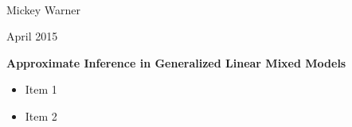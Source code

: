 \documentclass[mathserif, 11pt, t]{beamer}
\renewcommand{\subtitle}[1]{\vspace{0.45cm}\textcolor{bluegreen}{
    {\textbf{#1}}}\vspace{0.15cm}\newline}
\begin{document}
\begin{center}
\ \\ [-0.5in]
\vfill
\bigskip
\bigskip
\bigskip
\bigskip
\bigskip

\begin{LARGE}
\begin{center}

\end{center}
\end{LARGE}
\vfill

\begin{center}
Mickey Warner
\end{center}
\vfill
April 2015
\bigskip
\bigskip
\bigskip
\vfill
\ \\ [-0.5in]
\end{center}

\begin{frame}
\subtitle{Approximate Inference in Generalized Linear Mixed Models}
\begin{itemize}[label={$\cdot$}]
\item Item 1
\item Item 2
\end{itemize}
\end{frame}
\end{document}
